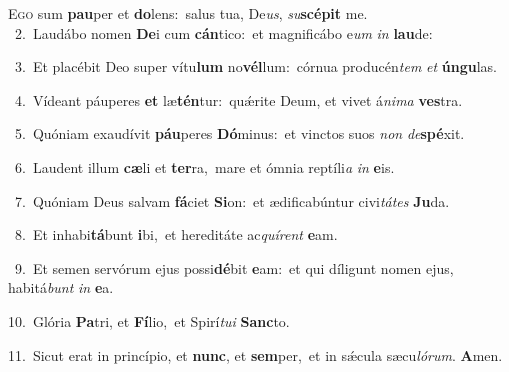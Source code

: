 \lettrine{\initial\textcolor{\initialcolor}{E}}{go} sum \textbf{pau}\-per et \textbf{do}\-lens:~\star salus tua, De\-\textit{us}\-, \textit{su}\-\textbf{scé}\textbf{pit} me.\\
{\numbfont\textcolor{\numbcolor}{~2.}}~Laudábo nomen \textbf{De}\-i cum \textbf{cán}\-tico:~\star et magnificábo e\textit{um} \textit{in} \textbf{lau}\-de:\par
{\numbfont\textcolor{\numbcolor}{~3.}}~Et placébit Deo super vítu\textbf{lum} no\-\textbf{vél}\-lum:~\star córnua producén\textit{tem} \textit{et} \textbf{ún}\-\textbf{gu}las.\par
{\numbfont\textcolor{\numbcolor}{~4.}}~Vídeant páuperes \textbf{et} læ\-\textbf{tén}\-tur:~\star quǽrite Deum, et vivet á\-\textit{ni}\-\textit{ma} \textbf{ves}\-tra.\par
{\numbfont\textcolor{\numbcolor}{~5.}}~Quóniam exaudívit \textbf{páu}\-peres \textbf{Dó}\-minus:~\star et vinctos suos \textit{non} \textit{de}\-\textbf{spé}xit.\par
{\numbfont\textcolor{\numbcolor}{~6.}}~Laudent illum \textbf{cæ}\-li et \textbf{ter}\-ra,~\star mare et ómnia reptíli\textit{a} \textit{in} \textbf{e}\-is.\par
{\numbfont\textcolor{\numbcolor}{~7.}}~Quóniam Deus salvam \textbf{fá}\-ciet \textbf{Si}\-on:~\star et ædificabúntur civi\-\textit{tá}\-\textit{tes} \textbf{Ju}\-da.\par
{\numbfont\textcolor{\numbcolor}{~8.}}~Et inhabi\-\textbf{tá}\-bunt \textbf{i}\-bi,~\star et hereditáte ac\-\textit{quí}\-\textit{rent} \textbf{e}\-am.\par
{\numbfont\textcolor{\numbcolor}{~9.}}~Et semen servórum ejus possi\-\textbf{dé}\-bit \textbf{e}\-am:~\star et qui díligunt nomen ejus, habitá\textit{bunt} \textit{in} \textbf{e}\-a.\par
{\numbfont\textcolor{\numbcolor}{10.}}~Glória \textbf{Pa}\-tri, et \textbf{Fí}\-lio,~\star et Spirí\-\textit{tu}\-\textit{i} \textbf{Sanc}\-to.\par
{\numbfont\textcolor{\numbcolor}{11.}}~Sicut erat in princípio, et \textbf{nunc}\-, et \textbf{sem}\-per,~\star et in sǽcula sæcu\-\textit{ló}\-\textit{rum}. \textbf{A}\-men.\par
